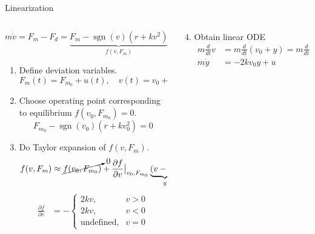 \documentclass[dvisvgm,hypertex,aspectratio=169]{beamer}
\DeclareMathOperator{\sign}{sgn}
\begin{document}
\begin{frame}[label=L2A]{Linearization}
  \footnotesize
  \begin{columns}
    \begin{column}{0.6\columnwidth}
      \[ m \dot{v} = F_m - F_d = \underbrace{F_m - \sign(v)(r + kv^2)}_{f(v, F_m)} = f(v, F_m)\]
      \begin{enumerate}
         \item Define deviation variables.
        \[ F_m(t) = F_{m_0} + u(t), \quad v(t) = v_0 + y(t)\]
        \pause
      \item Choose operating point corresponding to equilibrium \(f(v_0, F_{m_0}) = 0\).
        \[ F_{m_0} -  \sign(v_0)(r + kv_0^2) = 0\]
        \pause
      \item  Do Taylor expansion of \(f(v, F_m)\).
        \begin{align*}
        f(v, F_m) &\approx \cancelto{0}{f(v_0, F_{m_0})} + \frac{\partial f}{\partial v}\big|_{v_0, F_{m_0}} \underbrace{(v - v_0)}_{y} + \frac{\partial f}{\partial F_m}\big|_{v_0, F_{m_0}} \underbrace{(F_m - F_{m_0})}_{u} 
      \end{align*}
      \pause
      \begin{align*}
        \frac{\partial f}{\partial v} &= -\begin{cases} 2kv, & v>0\\2kv, & v<0\\\text{undefined}, & v=0 \end{cases}
      \end{align*}
    \end{enumerate}
  \end{column}
  \begin{column}{0.4\columnwidth}
    \pause
    \begin{enumerate}
      \setcounter{enumi}{3}
    \item Obtain linear ODE
      \begin{align*}
        m\frac{d}{dt} v &= m\frac{d}{dt} (v_0 + y) = m\frac{d}{dt} y = F_m - F_d
                          \approx u - 2kv_0y\\
        m\dot{y} &= -2kv_0y + u
      \end{align*}
    \end{enumerate}

    \pause
    
           

\end{column}
\end{columns}
\end{frame}
\end{document}
